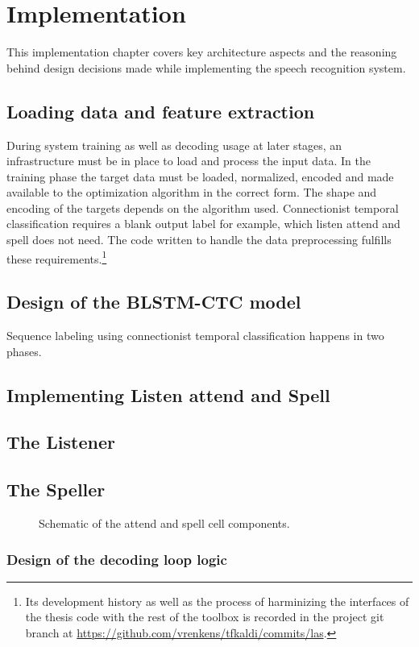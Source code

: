 \chapter{Implementation}
This implementation chapter covers key architecture aspects and the reasoning behind design decisions made while implementing the speech recognition system. 

\section{Loading data and feature extraction}
During system training as well as decoding usage at later stages, an infrastructure must be in place to load and process the input data. In the training phase the target data must be loaded, normalized, encoded and made available to the optimization algorithm in the correct form. The shape and encoding of the targets depends on the algorithm used. Connectionist temporal classification requires a blank output label for example, which listen attend and spell does not need.
The code written to handle the data preprocessing fulfills these requirements.\footnote{Its development history as well as the process of harminizing the interfaces of the thesis code with the rest of the toolbox is recorded in the project git branch at \url{https://github.com/vrenkens/tfkaldi/commits/las}.}

\section{Design of the BLSTM-CTC model}
Sequence labeling using connectionist temporal classification happens in two phases. 



\section{Implementing Listen attend and Spell  }

\section{The Listener}

\section{The Speller}

\begin{figure}
\centering

\caption{Schematic of the attend and spell cell components.}
\end{figure}

\subsection{Design of the decoding loop logic}